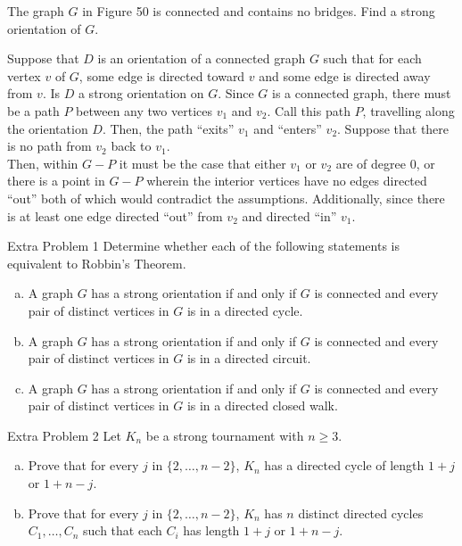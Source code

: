 \documentclass[8pt]{extarticle}
\title{}
\author{}
\date{}
\begin{document}
  \begin{problem}{3}
    The graph $G$ in Figure 50 is connected and contains no bridges. Find a strong orientation of $G$.
  \end{problem}
  \begin{problem}{4}
    Suppose that $D$ is an orientation of a connected graph $G$ such that for each vertex $v$ of $G$, some edge is directed toward $v$ and some edge is directed away from $v$. Is $D$ a strong orientation on $G$.
    \tcblower
    Since $G$ is a connected graph, there must be a path $P$ between any two vertices $v_1$ and $v_2$. Call this path $P$, travelling along the orientation $D$. Then, the path ``exits'' $v_1$ and ``enters'' $v_2$. Suppose that there is no path from $v_2$ back to $v_1$.\\

    Then, within $G-P$ it must be the case that either $v_1$ or $v_2$ are of degree $0$, or there is a point in $G - P$ wherein the interior vertices have no edges directed ``out'' both of which would contradict the assumptions. Additionally, since there is at least one edge directed ``out'' from $v_2$ and directed ``in'' $v_1$.
  \end{problem}
  \begin{problem}{Extra Problem 1}
    Determine whether each of the following statements is equivalent to Robbin's Theorem.
    \begin{enumerate}[(a)]
      \item A graph $G$ has a strong orientation if and only if $G$ is connected and every pair of distinct vertices in $G$ is in a directed cycle.
      \item A graph $G$ has a strong orientation if and only if $G$ is connected and every pair of distinct vertices in $G$ is in a directed circuit.
      \item A graph $G$ has a strong orientation if and only if $G$ is connected and every pair of distinct vertices in $G$ is in a directed closed walk.
    \end{enumerate}
  \end{problem}
  \begin{problem}{Extra Problem 2}
    Let $K_n$ be a strong tournament with $n \geq 3$. 
    \begin{enumerate}[(a)]
      \item Prove that for every $j$ in $\{2,\dots,n-2\}$, $K_n$ has a directed cycle of length $1 + j$ or $1 + n - j$. 
      \item Prove that for every $j$ in $\{2,\dots,n-2\}$, $K_n$ has $n$ distinct directed cycles $C_1,\dots,C_n$ such that each $C_i$ has length $1 + j$ or $1 + n - j$.
    \end{enumerate}
  \end{problem}
\end{document}
